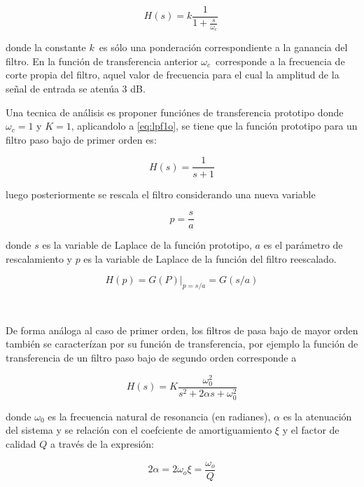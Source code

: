 \documentclass{article}
\begin{document}
\begin{equation}\label{eq:lpf1o}
H(s)=k\frac{1}{1+\frac{s}{\omega_c}} \,
\end{equation}

donde la constante $k \,$ es sólo una ponderación correspondiente a la
ganancia del filtro. En la función de transferencia anterior
$\omega_c \,$ corresponde a la frecuencia de corte propia del filtro,
aquel valor de frecuencia para el cual la amplitud de la señal de
entrada se atenúa 3 dB.

Una tecnica de análisis es proponer funciónes de transferencia prototipo
donde $\omega_{c}=1$ y $K=1$, aplicandolo a \eqref{eq:lpf1o}, se tiene
que la función prototipo para un filtro paso bajo de primer orden es:

\begin{equation}\label{eq:lpf1op}
H(s)=\frac{1}{s+1}
\end{equation}

luego posteriormente se rescala el filtro considerando una nueva
variable

\[
p=\frac{s}{a}
\]

donde $s$ es la variable de Laplace de la función prototipo, $a$ es el
parámetro de rescalamiento y $p$ es la variable de Laplace de la función
del filtro reescalado.

\[
H(p)=G(P)|_{p=s/a}=G(s/a)
\]


    \begin{center}
    \end{center}
    { \hspace*{\fill} \\}
    
    De forma análoga al caso de primer orden, los filtros de pasa bajo de
mayor orden también se caracterízan por su función de transferencia, por
ejemplo la función de transferencia de un filtro paso bajo de segundo
orden corresponde a

\begin{equation}
H(s) =K \frac{\omega_0^{2}}{  s^{2} + 2 \alpha s + \omega_{0}^{2} } 
\end{equation}

donde $\omega_0$ es la frecuencia natural de resonancia (en radianes),
$\alpha$ es la atenuación del sistema y se relación con el coefciente de
amortiguamiento $\xi$ y el factor de calidad $Q$ a través de la
expresión:

\begin{equation}
2\alpha=2\omega_{o} \xi=\frac{\omega_{o}}{Q}
\end{equation}
\end{document}
